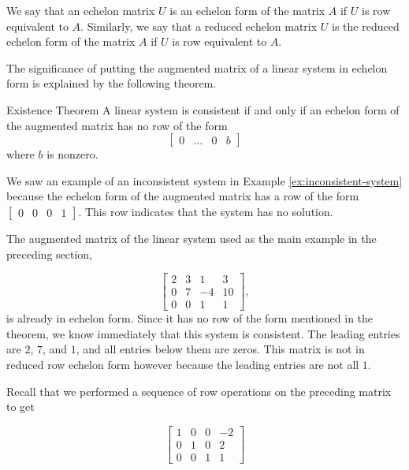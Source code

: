 We say that an echelon matrix $U$ is an echelon form of the matrix $A$ if $U$ is row equivalent to $A$. Similarly, we say that a reduced echelon matrix $U$ is the reduced echelon form of the matrix $A$ if $U$ is row equivalent to $A$.

The significance of putting the augmented matrix of a linear system in echelon form is explained by the
following theorem.

\begin{theorem}{Existence Theorem}
A linear system is consistent if and only if an echelon form of the augmented matrix has no row of the form
    \[
    \left[\begin{array}{llll}
    0 & \ldots & 0 & b
    \end{array}\right]
    \]
where $b$ is nonzero.
\end{theorem}

We saw an example of an inconsistent system in Example \ref{ex:inconsistent-system} because the echelon form of the augmented matrix has a row of the form $\left[\begin{array}{lll|l} 0 & 0 & 0 & 1 \end{array}\right]$. This row indicates that the system has no solution.

\begin{example}
    The augmented matrix of the linear system used as the main example in the preceding section,

\[
\left[\begin{array}{cccc}
2 & 3 & 1 & 3 \\
0 & 7 & -4 & 10 \\
0 & 0 & 1 & 1
\end{array}\right] , 
\] is already in echelon form. Since it has no row of the form mentioned in the theorem, we know immediately
that this system is consistent. The leading entries are $2$, $7$, and $1$, and all entries below them are zeros. This matrix is not in reduced row echelon form however because the leading entries are not all $1$.
\end{example}

Recall that we performed a sequence of row operations on the preceding matrix to get

\[
\left[\begin{array}{cccc}
1 & 0 & 0 & -2 \\
0 & 1 & 0 & 2 \\
0 & 0 & 1 & 1
\end{array}\right]
\]

